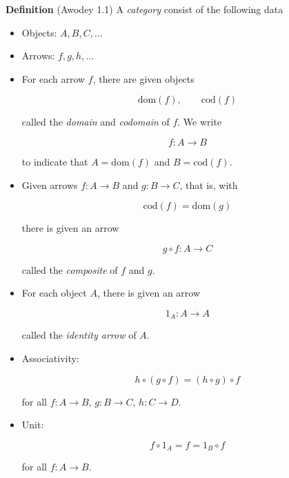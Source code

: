 \documentclass{article}
\begin{document}
\textbf{Definition} (Awodey 1.1)
A \emph{category} consist of the following data
\begin{itemize}
\item Objects: $A, B, C, \ldots$
\item Arrows: $f, g, h, \ldots$

\item For each arrow $f$, there are given objects

\begin{equation*}
\mathrm{dom}(f), \qquad \mathrm{cod}(f)
\end{equation*}

called the \emph{domain} and \emph{codomain} of $f$. We write

\begin{equation*}
f : A \to B
\end{equation*}

to indicate that $A = \mathrm{dom}(f)$ and $B = \mathrm{cod}(f)$.

\item Given arrows $f : A \to B$ and $g : B \to C$, that is, with

\begin{equation*}
\mathrm{cod}(f) = \mathrm{dom}(g)
\end{equation*}

there is given an arrow

\begin{equation*}
g \circ f : A \to C
\end{equation*}

called the \emph{composite} of $f$ and $g$.

\item For each object $A$, there is given an arrow

\begin{equation*}
1_A : A \to A
\end{equation*}

called the \emph{identity arrow} of $A$.

\item Associativity:

\begin{equation*}
h \circ (g \circ f) = (h \circ g) \circ f
\end{equation*}

for all $f : A \to B$, $g : B \to C$, $h : C \to D$.

\item Unit:

\begin{equation*}
f \circ 1_A = f = 1_B \circ f
\end{equation*}

for all $f : A \to B$.
\end{itemize}
\end{document}
